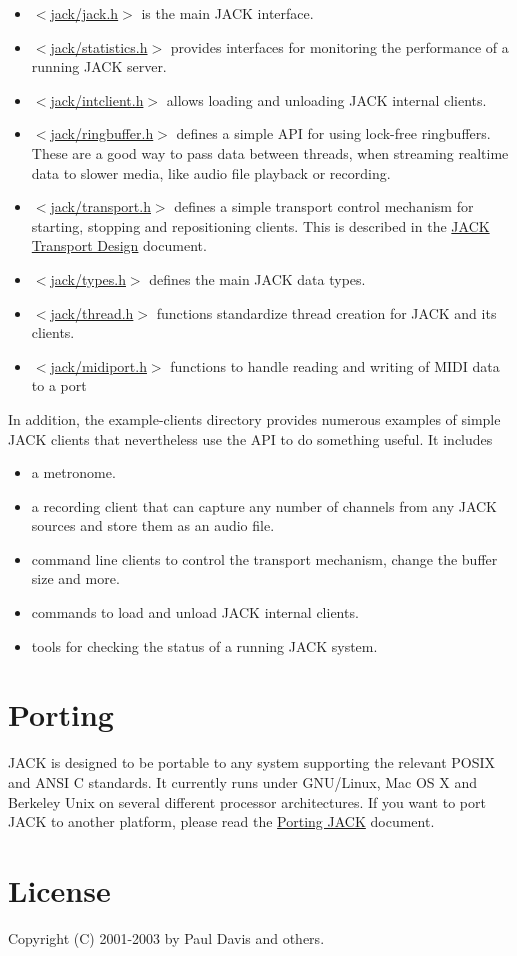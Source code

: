 \begin{itemize}
\item \hyperlink{jack_8h}{$<$jack/jack.h$>$} is the main JACK interface.\item \hyperlink{statistics_8h}{$<$jack/statistics.h$>$} provides interfaces for monitoring the performance of a running JACK server.\item \hyperlink{intclient_8h}{$<$jack/intclient.h$>$} allows loading and unloading JACK internal clients.\item \hyperlink{ringbuffer_8h}{$<$jack/ringbuffer.h$>$} defines a simple API for using lock-free ringbuffers. These are a good way to pass data between threads, when streaming realtime data to slower media, like audio file playback or recording.\item \hyperlink{transport_8h}{$<$jack/transport.h$>$} defines a simple transport control mechanism for starting, stopping and repositioning clients. This is described in the \hyperlink{transport-design}{JACK Transport Design} document.\item \hyperlink{types_8h}{$<$jack/types.h$>$} defines the main JACK data types.\item \hyperlink{thread_8h}{$<$jack/thread.h$>$} functions standardize thread creation for JACK and its clients.\item \hyperlink{midiport_8h}{$<$jack/midiport.h$>$} functions to handle reading and writing of MIDI data to a port\end{itemize}


In addition, the example-clients directory provides numerous examples of simple JACK clients that nevertheless use the API to do something useful. It includes

\begin{itemize}
\item a metronome.\item a recording client that can capture any number of channels from any JACK sources and store them as an audio file.\item command line clients to control the transport mechanism, change the buffer size and more.\item commands to load and unload JACK internal clients.\item tools for checking the status of a running JACK system.\end{itemize}
\hypertarget{index_porting}{}\section{Porting}\label{index_porting}
JACK is designed to be portable to any system supporting the relevant POSIX and ANSI C standards. It currently runs under GNU/Linux, Mac OS X and Berkeley Unix on several different processor architectures. If you want to port JACK to another platform, please read the \hyperlink{porting-guide}{Porting JACK} document.\hypertarget{index_license}{}\section{License}\label{index_license}
Copyright (C) 2001-2003 by Paul Davis and others.

